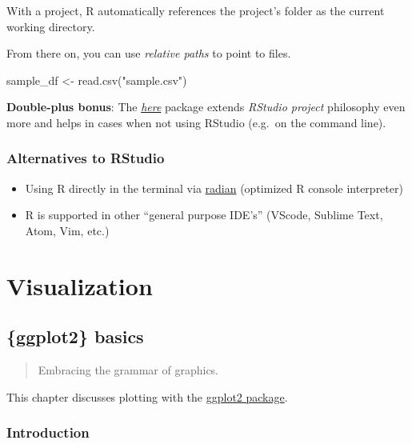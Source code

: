 \documentclass[]{book}
\newenvironment{Shaded}{}{}
\newcommand{\KeywordTok}[1]{\textcolor[rgb]{0.00,0.00,1.00}{#1}}
\newcommand{\NormalTok}[1]{#1}
\newcommand{\StringTok}[1]{\textcolor[rgb]{0.00,0.50,0.50}{#1}}
\begin{document}
With a project, R automatically references the project's folder as the current working directory.

From there on, you can use \emph{relative paths} to point to files.

\begin{Shaded}
\begin{Highlighting}[]
\NormalTok{sample_df <-}\StringTok{ }\KeywordTok{read.csv}\NormalTok{(}\StringTok{"sample.csv"}\NormalTok{)}
\end{Highlighting}
\end{Shaded}

\textbf{Double-plus bonus}: The \href{https://github.com/r-lib/here}{\emph{here}} package extends \emph{RStudio project} philosophy even more and helps in cases when not using RStudio (e.g.~on the command line).

\hypertarget{alternatives-to-rstudio}{%
\section{Alternatives to RStudio}\label{alternatives-to-rstudio}}

\begin{itemize}
\item
  Using R directly in the terminal via \href{https://github.com/randy3k/radian}{radian} (optimized R console interpreter)
\item
  R is supported in other ``general purpose IDE's'' (VScode, Sublime Text, Atom, Vim, etc.)
\end{itemize}

\hypertarget{part-visualization}{%
\part{Visualization}\label{part-visualization}}

\hypertarget{vis-basics}{%
\chapter{\{ggplot2\} basics}\label{vis-basics}}

\begin{quote}
Embracing the grammar of graphics.
\end{quote}

This chapter discusses plotting with the \href{https://ggplot2.tidyverse.org/}{ggplot2 package}.

\hypertarget{introduction-1}{%
\section{Introduction}\label{introduction-1}}
\end{document}

